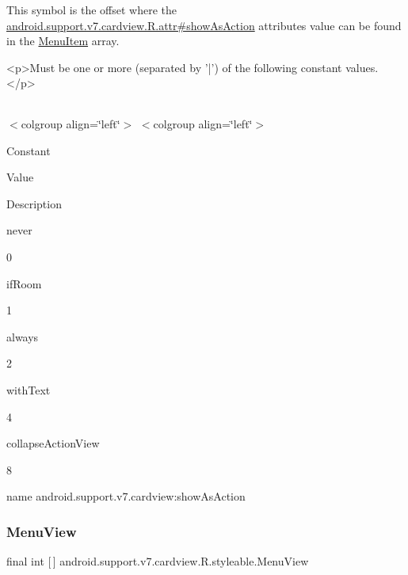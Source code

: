 This symbol is the offset where the \hyperlink{classandroid_1_1support_1_1v7_1_1cardview_1_1R_1_1attr_a895b2c4c5e40bf53be20402ec2dcd9a7}{android.\+support.\+v7.\+cardview.\+R.\+attr\#show\+As\+Action} attribute\textquotesingle{}s value can be found in the \hyperlink{classandroid_1_1support_1_1v7_1_1cardview_1_1R_1_1styleable_a0a483b830af809d94b22d4901e758447}{Menu\+Item} array.

\begin{DoxyVerb}      <p>Must be one or more (separated by '|') of the following constant values.</p>
\end{DoxyVerb}
 \tabulinesep=1mm
\begin{longtabu} spread 0pt [c]{*{0}{|X[-1]}|}
\hline
\end{longtabu}
$<$colgroup align=\char`\"{}left\char`\"{}$>$ $<$colgroup align=\char`\"{}left\char`\"{}$>$ 

Constant

Value

Description 

{\ttfamily never}

0

{\ttfamily if\+Room}

1

{\ttfamily always}

2

{\ttfamily with\+Text}

4

{\ttfamily collapse\+Action\+View}

8

name android.\+support.\+v7.\+cardview\+:show\+As\+Action \mbox{\label{classandroid_1_1support_1_1v7_1_1cardview_1_1R_1_1styleable_aa9f6c3d6d02cac9913617e27d0db7b5f}} 
\subsubsection{\texorpdfstring{Menu\+View}{MenuView}}
{\footnotesize\ttfamily final int \mbox{[}$\,$\mbox{]} android.\+support.\+v7.\+cardview.\+R.\+styleable.\+Menu\+View\hspace{0.3cm}{\ttfamily [static]}}

